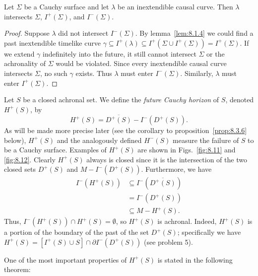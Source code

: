 \begin{proposition}\label{prop:8.3.4}
Let \(\Sigma\) be a Cauchy surface and let \(\lambda\) be an inextendible causal
curve. Then \(\lambda\) intersects \(\Sigma\), \(I^+(\Sigma)\), and \(I^-(\Sigma)\).
\end{proposition}
\begin{proof}
Suppose \(\lambda\) did not intersect \(I^-(\Sigma)\). By lemma~\ref{lem:8.1.4} we
could find a past inextendible timelike curve
\(\gamma\subseteq I^+(\lambda)\subseteq I^+(\Sigma\cup I^+(\Sigma))=I^+(\Sigma)\).
If we extend \(\gamma\) indefinitely into the future, it still cannot intersect
\(\Sigma\) or the achronality of \(\Sigma\) would be violated. Since every
inextendible causal curve intersects \(\Sigma\), no such \(\gamma\) exists. Thus
\(\lambda\) must enter \(I^-(\Sigma)\). Similarly, \(\lambda\) must enter
\(I^+(\Sigma)\).
\end{proof}

Let \(S\) be a closed achronal set. We define the \emph{future Cauchy horizon} of
\(S\), denoted \(H^+(S)\), by
\begin{equation}
  H^+(S)=\overline{D^+(S)}-I^-(D^+(S)).
  \tag{8.3.3}\label{eq:8.3.3}
\end{equation}
As will be made more precise later (see the corollary to proposition~\ref{prop:8.3.6}
below), \(H^+(S)\) and the analogously defined \(H^-(S)\) measure the failure of
\(S\) to be a Cauchy surface. Examples of \(H^+(S)\) are shown in
Figs.~\ref{fig:8.11} and \ref{fig:8.12}. Clearly \(H^+(S)\) always is closed since it
is the intersection of the two closed sets \(D^+(S)\) and \(M-I^-(D^+(S))\).
Furthermore, we have
\begin{equation}
  \begin{aligned}
    I^-(H^+(S))&\subseteq I^-(\overline{D^+(S)})\\
      &=I^-(D^+(S))\\
      &\subseteq M-H^+(S).
  \end{aligned}
  \tag{8.3.4}\label{eq:8.3.4}
\end{equation}
Thus, \(I^-(H^+(S))\cap H^+(S)=\emptyset\), so \(H^+(S)\) is achronal. Indeed,
\(H^+(S)\) is a portion of the boundary of the past of the set \(D^+(S)\);
specifically we have
\(H^+(S)=[I^+(S)\cup S]\cap\partial I^-(D^+(S))\) (see problem 5).

One of the most important properties of \(H^+(S)\) is stated in the following
theorem:

